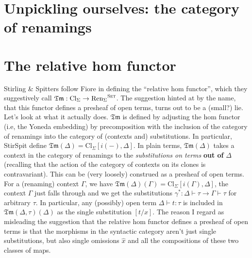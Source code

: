 \documentclass[11pt]{article}
\begin{document}
\section{Unpickling ourselves: the category of renamings}
\label{sec:orgd3ffb4b}

\section{The relative hom functor}
\label{sec:org64b2b42}
Stirling \& Spitters follow Fiore in defining the ``relative hom functor'', which
they suggestively call \(\mathfrak{Tm} : \text{Cl}_{\Sigma} \rightarrow
{\text{Ren}_\Sigma}^{\textsc{Set}}\). The suggestion hinted at by the name,
that this functor defines a presheaf of open terms, turns out to be a (small?)
lie. Let's look at what it actually does. \(\mathfrak{Tm}\) is defined by
adjusting the hom functor (i.e, the Yoneda embedding) by precomposition with the
inclusion of the category of renamings into the category of (contexts and)
substitutions. In particular, StirSpit define \(\mathfrak{Tm}(\Delta) =
\text{Cl}_{\Sigma} [i(-), \Delta]\). In plain terms, \(\mathfrak{Tm}(\Delta)\)
takes a context in the category of renamings to the \emph{substitutions on terms}
\textbf{out of} \(\Delta\) (recalling that the action of the category of contexts on
its clones is contravariant). This can be (very loosely) construed as a presheaf
of open terms. For a (renaming) context \(\Gamma\), we have
\(\mathfrak{Tm}(\Delta)(\Gamma) = \text{Cl}_{\Sigma} [i(\Gamma), \Delta]\), the
context \(\Gamma\) just falls through and we get the substitutions \(\gamma^{*} : \Delta \vdash \tau \rightarrow \Gamma \vdash \tau\) for arbitrary
\(\tau\). In particular, any (possibly) open term \(\Delta \vdash t : \tau\)
is included in \(\mathfrak{Tm}(\Delta,\tau)(\Delta)\) as the single
substitution \([t/x]\). The reason I regard as misleading the suggestion that
the relative hom functor defines a presheaf of open terms is that the morphisms
in the syntactic category aren't just single substitutions, but also single
omissions \(\hat{x}\) and all the compositions of these two classes of maps.
\end{document}
